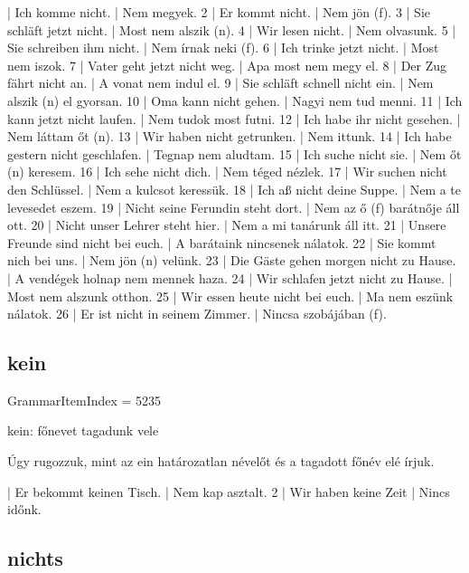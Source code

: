 \documentclass{article}
\newenvironment{desc}{\verbatim}{\endverbatim}
\newenvironment{exmp}{\verbatim}{\endverbatim}
\begin{document}
\begin{exmp}
1 | Ich komme nicht. | Nem megyek.
2 | Er kommt nicht. | Nem jön (f).
3 | Sie schläft jetzt nicht. | Most nem alszik (n).
4 | Wir lesen nicht. | Nem olvasunk.
5 | Sie schreiben ihm nicht. | Nem írnak neki (f).
6 | Ich trinke jetzt nicht. | Most nem iszok.
7 | Vater geht jetzt nicht weg. | Apa most nem megy el.
8 | Der Zug fährt nicht an. | A vonat nem indul el.
9 | Sie schläft schnell nicht ein. | Nem alszik (n) el gyorsan.
10 | Oma kann nicht gehen. | Nagyi nem tud menni.
11 | Ich kann jetzt nicht laufen. | Nem tudok most futni.
12 | Ich habe ihr nicht gesehen. | Nem láttam őt (n).
13 | Wir haben nicht getrunken. | Nem ittunk.
14 | Ich habe gestern nicht geschlafen. | Tegnap nem aludtam.
15 | Ich suche nicht sie. | Nem őt (n) keresem.
16 | Ich sehe nicht dich. | Nem téged nézlek.
17 | Wir suchen nicht den Schlüssel. | Nem a kulcsot keressük.
18 | Ich aß nicht deine Suppe. | Nem a te levesedet eszem.
19 | Nicht seine Ferundin steht dort. | Nem az ő (f) barátnője áll ott.
20 | Nicht unser Lehrer steht hier. | Nem a mi tanárunk áll itt.
21 | Unsere Freunde sind nicht bei euch. | A barátaink nincsenek nálatok.
22 | Sie kommt nich bei uns. | Nem jön (n) velünk.
23 | Die Gäste gehen morgen nicht zu Hause. | A vendégek holnap nem mennek haza.
24 | Wir schlafen jetzt nicht zu Hause. | Most nem alszunk otthon.
25 | Wir essen heute nicht bei euch. | Ma nem eszünk nálatok.
26 | Er ist nicht in seinem Zimmer. | Nincsa szobájában (f).
\end{exmp}

\subsection{kein}

GrammarItemIndex = 5235

\begin{desc}
kein: főnevet tagadunk vele

Úgy rugozzuk, mint az ein határozatlan névelőt és a tagadott főnév elé írjuk.
\end{desc}

\begin{exmp}
1 | Er bekommt keinen Tisch. | Nem kap asztalt.
2 | Wir haben keine Zeit | Nincs időnk.
\end{exmp}

\subsection{nichts}
\end{document}
